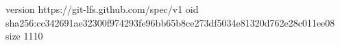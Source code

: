 version https://git-lfs.github.com/spec/v1
oid sha256:cc342691ae32300f974293fe96bb65b8ce273df5034e81320d762e28c011ee08
size 1110
